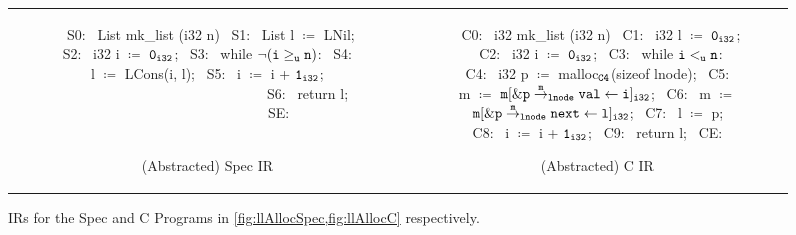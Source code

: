 \begin{figure}[H]
\begin{tabular}{cc}
\begin{subfigure}[b]{0.4\textwidth}
\begin{center}
\begin{allLangEnvFoot}
~{\scriptsize \textcolor{mygray}{S0:}}~ List mk_list (i32 n) {
~{\scriptsize \textcolor{mygray}{S1:}}~   List l $\coloneqq$ LNil;
~{\scriptsize \textcolor{mygray}{S2:}}~   i32  i $\coloneqq$ ${\tt 0_{i32}}$;
~{\scriptsize \textcolor{mygray}{S3:}}~   while $\mathrm{\tt \neg (i \geq_{u} n)}$:
~{\scriptsize \textcolor{mygray}{S4:}}~     l $\coloneqq$ LCons(i, l);
~{\scriptsize \textcolor{mygray}{S5:}}~     i $\coloneqq$ i + ${\tt 1_{i32}}$; $\phantom{m \coloneqq \mathrm{\tt m[\&\structPointer{\tt p}{m}{\tt lnode}{val} \leftarrow i]_{i32}};}$
~{\scriptsize \textcolor{mygray}{S6:}}~   return l; $\phantom{m \coloneqq \mathrm{\tt m[\&\structPointer{\tt p}{m}{\tt lnode}{next} \leftarrow l]_{i32}};}$
~{\scriptsize \textcolor{mygray}{SE:}}~ }
~{\scriptsize \textcolor{mygray}{   }}~
~{\scriptsize \textcolor{mygray}{   }}~
~{\scriptsize \textcolor{mygray}{   }}~
\end{allLangEnvFoot}
\end{center}
\vspace{-15px}
\caption{\label{fig:llAllocSpecIR}(Abstracted) Spec IR}
\end{subfigure}%
&
\begin{subfigure}[b]{0.6\textwidth}
\begin{center}
\begin{allLangEnvFoot}
~{\scriptsize \textcolor{mygray}{C0:}}~ i32 mk_list (i32 n) {
~{\scriptsize \textcolor{mygray}{C1:}}~   i32 l $\coloneqq$ ${\tt 0_{i32}}$;
~{\scriptsize \textcolor{mygray}{C2:}}~   i32 i $\coloneqq$ ${\tt 0_{i32}}$;
~{\scriptsize \textcolor{mygray}{C3:}}~   while ${\tt i <_{u} n}$:
~{\scriptsize \textcolor{mygray}{C4:}}~     i32 p $\coloneqq$ malloc$_{\tt C4}$(sizeof lnode);
~{\scriptsize \textcolor{mygray}{C5:}}~     m $\coloneqq$ $\mathrm{\tt m[\&{\tt \tt p} \overset{m}{\rightarrow}_{\tt lnode} {\tt val} \leftarrow i]_{i32}}$;
~{\scriptsize \textcolor{mygray}{C6:}}~     m $\coloneqq$ $\mathrm{\tt m[\&{\tt \tt p} \overset{m}{\rightarrow}_{\tt lnode} {\tt next} \leftarrow l]_{i32}}$;
~{\scriptsize \textcolor{mygray}{C7:}}~     l $\coloneqq$ p;
~{\scriptsize \textcolor{mygray}{C8:}}~     i $\coloneqq$ i + ${\tt 1_{i32}}$;
~{\scriptsize \textcolor{mygray}{C9:}}~   return l;
~{\scriptsize \textcolor{mygray}{CE:}}~ }
\end{allLangEnvFoot}
\end{center}
\vspace{-15px}
\caption{\label{fig:llAllocCIR}(Abstracted) C IR}
\end{subfigure}%
\\
\end{tabular}
\caption{\label{fig:llAllocSpecIRAndCIR}IRs for the Spec and C Programs in \cref{fig:llAllocSpec,fig:llAllocC} respectively.}
\end{figure}
